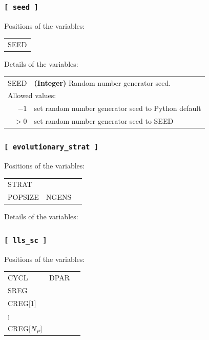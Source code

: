 \documentclass[10pt,a4paper,openany]{memoir}
\numberwithin{equation}{section}
\begin{document}
\subsubsection{\texttt{[~seed~]}}
\label{sec:inp-seed}

Positions of the variables:
\begin{center}
  \begin{tabular}{l}
    SEED
  \end{tabular}
\end{center}

\noindent Details of the variables:
\vspace{2ex}

{
\begin{tabular}{r@{ : }l}
\label{descr:seed}
      SEED&\textbf{(Integer)} Random number generator seed.                                                                        \\ 
\multicolumn{2}{l}{Allowed values:} \\ 
    \(-1\)&set random number generator seed to Python default                                                  \\ 
    \(>0\)&set random number generator seed to SEED                                                             \\ 
\end{tabular}
\vspace{1ex}
}

\subsubsection{\texttt{[~evolutionary\_strat~]}}
\label{sec:inp-ga}

Positions of the variables:
\begin{center}
  \begin{tabular}{lll}
    STRAT & \\
    POPSIZE & NGENS & \\
  \end{tabular}
\end{center}

\noindent Details of the variables:
\vspace{2ex}

\subsubsection{\texttt{[~lls\_sc~]}}
\label{sec:descr:lls}

Positions of the variables:
\begin{center}
  \begin{tabular}{lll}
    CYCL & DPAR & \\
    SREG &   & \\
    CREG[1] & & \\
    $\vdots$ & & \\
    CREG[$N_P$] & & 
  \end{tabular}
\end{center}
\end{document}
